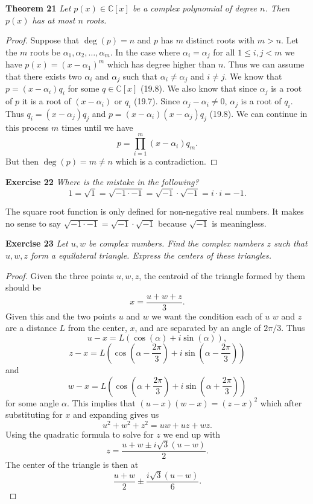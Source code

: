\documentclass{article}
\begin{document}
\begin{flushleft}
\textbf{Theorem 21}
\textsl{Let $p(x) \in \mathbb{C}[x]$ be a complex polynomial of degree $n$. Then $p(x)$ has at most $n$ roots.}
\begin{proof}
Suppose that $\deg(p) = n$ and $p$ has $m$ distinct roots with $m>n$. Let the $m$ roots be $\alpha_1, \alpha_2, \dots ,\alpha_m$. In the case where $\alpha_i = \alpha_j$ for all $1 \leq i,j < m$ we have $p(x) = (x-\alpha_1)^m$ which has degree higher than $n$. Thus we can assume that there exists two $\alpha_i$ and $\alpha_j$ such that $\alpha_i \neq \alpha_j$ and $i \neq j$. We know that $p = (x-\alpha_i)q_i$ for some $q \in \mathbb{C}[x]$ (19.8). We also know that since $\alpha_j$ is a root of $p$ it is a root of $(x-\alpha_i)$ or $q_i$ (19.7). Since $\alpha_j-\alpha_i \neq 0$, $\alpha_j$ is a root of $q_i$. Thus $q_i = (x-\alpha_j)q_j$ and $p = (x-\alpha_i)(x-\alpha_j)q_j$ (19.8). We can continue in this process $m$ times until we have
\[
p = \prod_{i=1}^m (x-\alpha_i) q_m.
\]
But then $\deg(p) = m \neq n$ which is a contradiction.
\end{proof}

\textbf{Exercise 22}
\textsl{Where is the mistake in the following?
\[
1 = \sqrt{1} = \sqrt{-1 \cdot -1}  = \sqrt{-1} \cdot \sqrt{-1} = i \cdot i = -1.
\]}

The square root function is only defined for non-negative real numbers. It makes no sense to say $\sqrt{-1 \cdot -1} = \sqrt{-1} \cdot \sqrt{-1}$ because $\sqrt{-1}$ is meaningless.\newline

\textbf{Exercise 23}
\textsl{Let $u,w$ be complex numbers. Find the complex numbers $z$ such that $u,w,z$ form a equilateral triangle. Express the centers of these triangles.}
\begin{proof}
Given the three points $u,w,z$, the centroid of the triangle formed by them should be
\[
x = \frac{u+w+z}{3}.
\]
Given this and the two points $u$ and $w$ we want the condition each of $u$ $w$ and $z$ are a distance $L$ from the center, $x$, and are separated by an angle of $2 \pi /3$. Thus
\[
u-x = L \left ( \cos \left ( \alpha \right ) + i \sin \left ( \alpha \right ) \right ),
\]
\[
z-x = L \left ( \cos \left ( \alpha - \frac{2 \pi}{3} \right ) + i \sin \left ( \alpha - \frac{2 \pi}{3} \right ) \right )
\]
and
\[
w-x = L \left ( \cos \left ( \alpha + \frac{2 \pi}{3} \right ) + i \sin \left ( \alpha + \frac{2 \pi}{3} \right ) \right )
\]
for some angle $\alpha$. This implies that $(u-x)(w-x) = (z-x)^2$ which after substituting for $x$ and expanding gives us
\[
u^2 + w^2 + z^2 = uw + uz + wz.
\]
Using the quadratic formula to solve for $z$ we end up with
\[
z = \frac{u + w \pm i \sqrt{3}(u-w)}{2}.
\]
The center of the triangle is then at
\[
\frac{u+w}{2} \pm \frac{i \sqrt{3} (u-w)}{6}.
\]
\end{proof}


\end{flushleft}
\end{document}
